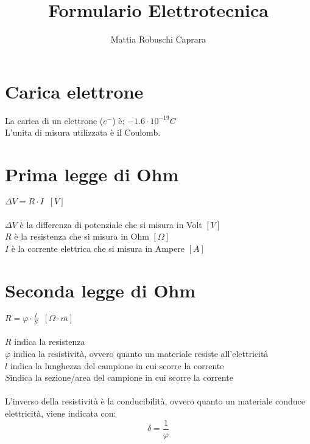 \documentclass{article}
\title{Formulario Elettrotecnica}
\author{Mattia Robuschi Caprara}
\date{}
\begin{document}
\maketitle

\newpage

\tableofcontents

\newpage

\section{Carica elettrone}
La carica di un elettrone ($e^-$) è: $-1.6 \cdot 10^{-19} C$ \\
L'unita di misura utilizzata è il Coulomb.

\section{Prima legge di Ohm}
$\Delta V = R \cdot I \;\; [V]$ \\ \\
$\Delta V$ è la differenza di potenziale che si misura in Volt $[V]$ \\
$R$ è la resistenza che si misura in Ohm $[\Omega]$ \\
$I$ è la corrente elettrica che si misura in Ampere $[A]$

\section{Seconda legge di Ohm}
$R = \varphi \cdot \frac{l}{S} \;\; [\Omega \cdot m]$ \\ \\
$R$ indica la resistenza \\
$\varphi$ indica la resistività, ovvero quanto un materiale resiste all'elettricità \\
$l$ indica la lunghezza del campione in cui scorre la corrente \\
$S$indica la sezione/area del campione in cui scorre la corrente \\ \\
L'inverso della resistività è la conducibilità, ovvero quanto un materiale conduce elettricità, viene indicata con:
\[ \delta = \frac{1}{\varphi} \]
\end{document}
